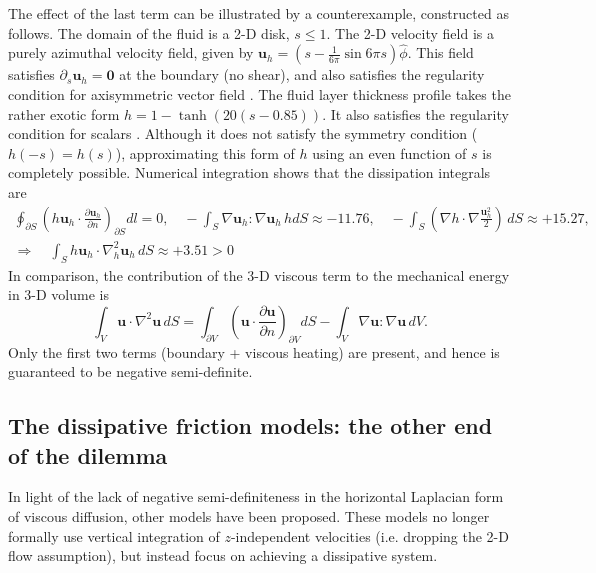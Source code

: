 The effect of the last term can be illustrated by a counterexample, constructed as follows. The domain of the fluid is a 2-D disk, $s\leq 1$. The 2-D velocity field is a purely azimuthal velocity field, given by $\mathbf{u}_h = (s - \frac{1}{6\pi} \sin 6\pi s) \hat{\phi}$. This field satisfies $\partial_s \mathbf{u}_h = \mathbf{0}$ at the boundary (no shear), and also satisfies the regularity condition for axisymmetric vector field \parencite{lewis_physical_1990}. The fluid layer thickness profile takes the rather exotic form $h = 1 - \tanh (20(s - 0.85))$. It also satisfies the regularity condition for scalars \parencite{lewis_physical_1990}. Although it does not satisfy the symmetry condition ($h(-s) = h(s)$), approximating this form of $h$ using an even function of $s$ is completely possible. Numerical integration shows that the dissipation integrals are 
\[\begin{gathered}
    \oint_{\partial S} \left(h \mathbf{u}_h \cdot \frac{\partial \mathbf{u}_h}{\partial n}\right)_{\partial S} dl = 0,\quad 
    - \int_S \nabla \mathbf{u}_h : \nabla \mathbf{u}_h \, h dS \approx -11.76,\quad
    - \int_S \left(\nabla h \cdot \nabla \frac{\mathbf{u}_h^2}{2}\right) \, dS \approx +15.27, \\ 
    \Longrightarrow \quad \int_S h \mathbf{u}_h \cdot \nabla_h^2 \mathbf{u}_h \, dS \approx +3.51 > 0
\end{gathered}\]
In comparison, the contribution of the 3-D viscous term to the mechanical energy in 3-D volume is
\[
    \int_V \mathbf{u} \cdot \nabla^2 \mathbf{u} \, dS = \int_{\partial V} \left(\mathbf{u}\cdot \frac{\partial \mathbf{u}}{\partial n}\right)_{\partial V} dS - \int_V \nabla \mathbf{u} : \nabla \mathbf{u} \, dV.
\]
Only the first two terms (boundary + viscous heating) are present, and hence is guaranteed to be negative semi-definite.

\subsection{The dissipative friction models: the other end of the dilemma}

In light of the lack of negative semi-definiteness in the horizontal Laplacian form of viscous diffusion, other models have been proposed. These models no longer formally use vertical integration of $z$-independent velocities (i.e. dropping the 2-D flow assumption), but instead focus on achieving a dissipative system. 


